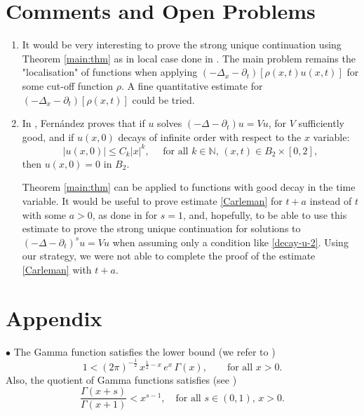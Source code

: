 \documentclass[11pt, twoside, notitlepage]{amsart}
\numberwithin{equation}{section}
\begin{document}
\section{Comments and Open Problems}

\begin{enumerate}


  \item It would be very interesting to prove the strong unique continuation using Theorem \ref{main:thm} as in local case done in \cite{EscauriazaDuke2000}. The main problem remains the  "localisation"  of functions when applying $(-\Delta_x-\partial_t)[\rho(x,t) u(x,t)]$ for some cut-off function $\rho$.  A fine quantitative estimate for $ (-\Delta_x-\partial_t)[\rho(x,t)]$ could be tried.

        \item In \cite[Lemma 2]{FernandezCPDEs2003}, Fern\'andez proves that if $u$ solves $(-\Delta -\partial_t) u =V u $, for $V$ sufficiently good,  and if $u(x,0)$  decays of infinite order with respect to the $x$ variable:
        \begin{equation}\label{decay-u-2}
    |u(x,0)| \le C_k |x|^k, \quad \text{ for all } k \in \mathbb{N}, \, (x,t)\in B_2 \times [0,2],
  \end{equation}
      then $u(x,0)=0$ in $B_2$.


   Theorem \ref{main:thm}  can be applied to functions with good decay in the time variable. It would be useful to prove estimate \eqref{Carleman} for $t+a$  instead of $t$ with some $a>0$, as done in \cite[Lemma 2]{FernandezCPDEs2003} for $s=1$, and, hopefully, to be able to use this estimate to prove the strong unique continuation for solutions to $(-\Delta -\partial_t)^s u =V u $ when assuming only a condition like \eqref{decay-u-2}.
    Using our strategy, we were not able to complete the proof of the  estimate \eqref{Carleman} with $t+a$.

  \end{enumerate}



\section{Appendix}


$\bullet$ The Gamma function satisfies the lower bound (we refer to \cite[formulla (5.6.1)]{OlMax})
\begin{equation}\label{Gamma:lower}
  1 < (2\pi)^{-\frac{1}{2}} \, x^{\frac{1}{2}-x} \, e^x \, \Gamma(x),\quad \quad \text{for all }x>0.
\end{equation}
Also, the quotient of Gamma functions satisfies (see \cite[formulla (5.6.4)]{OlMax})
\begin{equation}\label{ineq:Gamma}
  \frac{\Gamma(x+s)}{ \Gamma(x+1)} < x^{s-1},  \quad \text{for all } s\in (0,1),\, x>0.
\end{equation}
\end{document}

